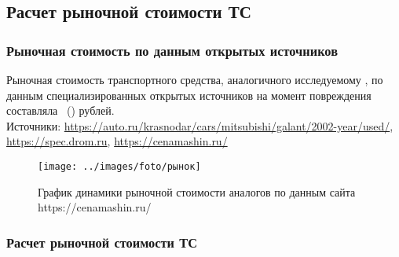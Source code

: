 \subsection{Расчет рыночной стоимости ТС}


\subsubsection{Рыночная стоимость по данным открытых источников}
Рыночная стоимость  транспортного средства, аналогичного исследуемому , по данным специализированных открытых источников на момент повреждения  составляла 
 \,  (\!\!) рублей.\\
Источники:  \url{https://auto.ru/krasnodar/cars/mitsubishi/galant/2002-year/used/}, \url{https://spec.drom.ru}, \url{https://cenamashin.ru/}


\begin{figure}[H]
	\centering
	\texttt{[image: ../images/foto/рынок]}
	\caption{График динамики рыночной стоимости аналогов по данным сайта https://cenamashin.ru/}
	\label{fig:111}
\end{figure}


\subsubsection{Расчет рыночной стоимости ТС}


